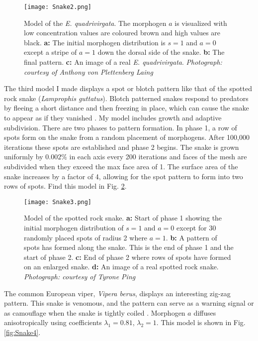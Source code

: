 \begin{figure}[ht]
	\centering
	\texttt{[image: Snake2.png]}
	\caption{Model of the \textit{E. quadrivirgata}. The morphogen $a$ is visualized with low concentration values are coloured brown and high values are black. \textbf{a:} The initial morphogen distribution is $s=1$ and $a=0$ except a stripe of $a=1$ down the dorsal side of the snake. \textbf{b:} The final pattern. \textbf{c:} An image of a real \textit{E. quadrivirgata}. \textit{Photograph: courtesy of Anthony von Plettenberg Laing}}
	\label{fig:Snake2}
\end{figure}

\newpage
The third model I made displays a spot or blotch pattern like that of the spotted rock snake (\textit{Lamprophis guttatus}). Blotch patterned snakes respond to predators by fleeing a short distance and then freezing in place, which can cause the snake to appear as if they vanished \citep{lillywhite2014}. 
My model includes growth and adaptive subdivision. There are two phases to pattern formation. In phase 1, a row of spots form on the snake from a random placement of morphogens. After 100,000 iterations these spots are established and phase 2 begins. The snake is grown uniformly by $0.002\%$ in each axis every 200 iterations and faces of the mesh are subdivided when they exceed the max face area of 1. The surface area of the snake increases by a factor of 4, allowing for the spot pattern to form into two rows of spots. Find this model in Fig. \ref{fig:Snake3}.

\begin{figure}[ht]
	\centering
	\texttt{[image: Snake3.png]}
	\caption{Model of the spotted rock snake. \textbf{a:} Start of phase 1 showing the initial morphogen distribution of $s=1$ and $a=0$ except for 30 randomly placed spots of radius 2 where $a=1$. \textbf{b:} A pattern of spots has formed along the snake. This is the end of phase 1 and the start of phase 2. \textbf{c:} End of phase 2 where rows of spots have formed on an enlarged snake. \textbf{d:} An image of a real spotted rock snake. \textit{Photograph: courtesy of Tyrone Ping}}
	\label{fig:Snake3}
\end{figure}

\newpage
The common European viper, \textit{Vipera berus}, displays an interesting zig-zag pattern. This snake is venomous, and the pattern can serve as a warning signal or as camouflage when the snake is tightly coiled \citep{lillywhite2014}. Morphogen $a$ diffuses anisotropically using coefficients $\lambda_{1}=0.81$, $\lambda_{2}=1$. This model is shown in Fig. \ref{fig:Snake4}.

